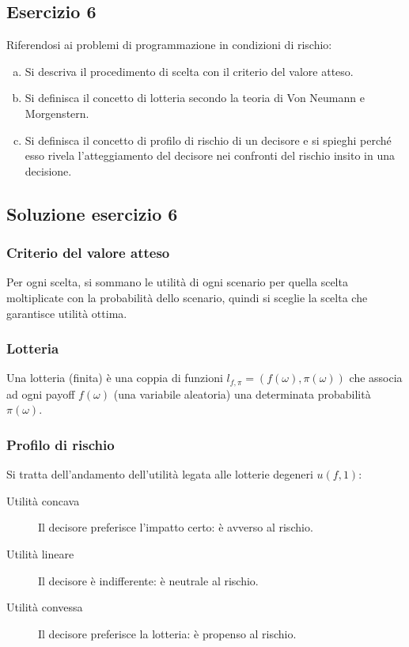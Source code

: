 \documentclass[\main/main.tex]{subfiles}
\begin{document}
\subsection{Esercizio 6}
Riferendosi ai problemi di programmazione in condizioni di rischio:

\begin{enumerate}[a)]
  \item Si descriva il procedimento di scelta con il criterio del valore atteso.
  \item Si definisca il concetto di lotteria secondo la teoria di Von Neumann e Morgenstern.
  \item Si definisca il concetto di profilo di rischio di un decisore e si spieghi perché esso rivela l'atteggiamento del decisore nei confronti del rischio insito in una decisione.
\end{enumerate}

\subsection{Soluzione esercizio 6}

\subsubsection*{Criterio del valore atteso}
Per ogni scelta, si sommano le utilità di ogni scenario per quella scelta moltiplicate con la probabilità dello scenario, quindi si sceglie la scelta che garantisce utilità ottima.

\subsubsection*{Lotteria}
Una lotteria (finita) è una coppia di funzioni $l_{f,\pi} = (f(\omega), \pi(\omega))$ che associa ad ogni payoff $f(\omega)$ (una variabile aleatoria) una determinata probabilità $\pi(\omega)$.

\subsubsection*{Profilo di rischio}
Si tratta dell'andamento dell'utilità legata alle lotterie degeneri $u(f,1)$:
\begin{description}
  \item[Utilità concava] Il decisore preferisce l'impatto certo: è avverso al rischio.
  \item[Utilità lineare] Il decisore è indifferente: è neutrale al rischio.
  \item[Utilità convessa] Il decisore preferisce la lotteria: è propenso al rischio.
\end{description}
\end{document}
